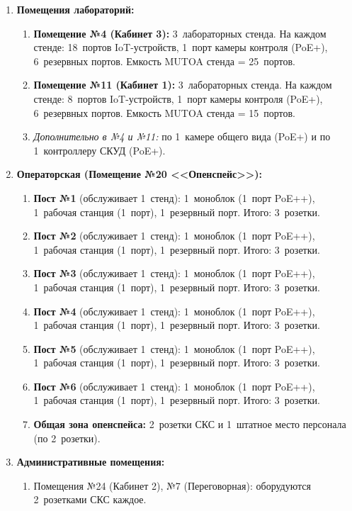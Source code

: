 \documentclass[a4paper,oneside,14pt]{extreport}
\begin{document}
\begin{enumerate}[label=\thesection.\arabic*]
    \item \textbf{Помещения лабораторий:}
    \begin{enumerate}[label=\thesection.\arabic{enumi}.\arabic*]
        \item \textbf{Помещение №4 (Кабинет 3):} 3~лабораторных стенда. На каждом стенде: 18~портов IoT-устройств, 1~порт камеры контроля (PoE+), 6~резервных портов. Емкость MUTOA стенда = 25~портов.
        \item \textbf{Помещение №11 (Кабинет 1):} 3~лабораторных стенда. На каждом стенде: 8~портов IoT-устройств, 1~порт камеры контроля (PoE+), 6~резервных портов. Емкость MUTOA стенда = 15~портов.
        \item \textit{Дополнительно в №4 и №11:} по 1~камере общего вида (PoE+) и по 1~контроллеру СКУД (PoE+).
    \end{enumerate}

    \item \textbf{Операторская (Помещение №20 <<Опенспейс>>):}
    \begin{enumerate}[label=\thesection.\arabic{enumi}.\arabic*]
        \item \textbf{Пост №1} (обслуживает 1~стенд): 1~моноблок (1~порт PoE++), 1~рабочая станция (1~порт), 1~резервный порт. Итого: 3~розетки.
        \item \textbf{Пост №2} (обслуживает 1~стенд): 1~моноблок (1~порт PoE++), 1~рабочая станция (1~порт), 1~резервный порт. Итого: 3~розетки.
        \item \textbf{Пост №3} (обслуживает 1~стенд): 1~моноблок (1~порт PoE++), 1~рабочая станция (1~порт), 1~резервный порт. Итого: 3~розетки.
        \item \textbf{Пост №4} (обслуживает 1~стенд): 1~моноблок (1~порт PoE++), 1~рабочая станция (1~порт), 1~резервный порт. Итого: 3~розетки.
        \item \textbf{Пост №5} (обслуживает 1~стенд): 1~моноблок (1~порт PoE++), 1~рабочая станция (1~порт), 1~резервный порт. Итого: 3~розетки.
        \item \textbf{Пост №6} (обслуживает 1~стенд): 1~моноблок (1~порт PoE++), 1~рабочая станция (1~порт), 1~резервный порт. Итого: 3~розетки.
        \item \textbf{Общая зона опенспейса:} 2~розетки СКС и 1~штатное место персонала (по 2~розетки).
    \end{enumerate}

    \item \textbf{Административные помещения:}
    \begin{enumerate}[label=\thesection.\arabic{enumi}.\arabic*]
        \item Помещения №24 (Кабинет 2), №7 (Переговорная): оборудуются 2~розетками СКС каждое.
    \end{enumerate}


\end{enumerate}
\end{document}
